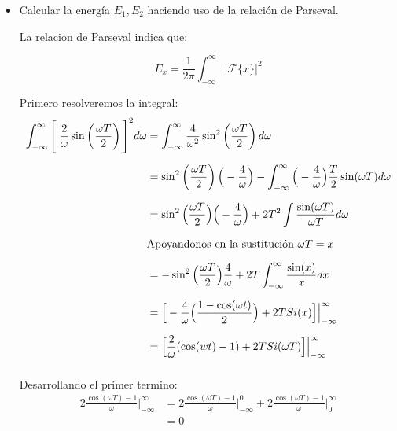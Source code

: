 \documentclass[12pt,a4paper]{report}
\begin{document}
\begin{enumerate}[label=\alph*),left=0pt]
\begin {itemize}[left=0pt]
\begin{figure}[h!]
\begin{minipage}{0.45\textwidth}
            \caption{Densidad espectral para $x_2$}
            \label{fig:imagen2}
          \end{minipage}
        \end{figure}

        \textbf{Reflexionar:} ¿La densidad espectral es discreta o continua? ¿El gráfico admite una simetría par, impar
        o ninguna?\\

        La densidad espectral tambien es una señal de tiempo continuo, y acepta simetria par.\\

      \item Calcular la energía $E_1, E_2$ haciendo uso de la relación de Parseval.

        La relacion de Parseval indica que:

        $$E_x=\frac{1}{2\pi}\int_{-\infty}^{\infty}|\mathcal{F}\{x\}|^2$$

        Primero resolveremos la integral:
        $$
        \begin{aligned}
          \int_{-\infty}^{\infty} \Bigg[\hspace{1mm}\frac{2}{\omega} \sin\left(\frac{\omega T}{2}\right)\Bigg]^2 d\omega
          &=\int_{-\infty}^{\infty} \frac{4}{\omega^2} \sin^2\left(\frac{\omega T}{2}\right) d\omega \\[6pt]
          &= \sin^2\left(\frac{\omega T}{2}\right) \Big(-\frac{4}{\omega}\Big) - \int_{-\infty}^{\infty} 
          \Big(-\frac{4}{\omega}\Big) \frac{T}{2} \sin(\omega T)d\omega \\[6pt]
          &= \sin^2\Big(\frac{\omega T}{2}\Big)\Big(-\frac{4}{\omega}\Big) +
            2 T^2 \int \frac{\sin(\omega T)}{\omega T}d\omega \\[6pt]
          &\text{Apoyandonos en la sustitución $\omega T=x$}\\[6pt]
          &=-\sin^2\Big(\frac{\omega T}{2}\Big)\frac{4}{\omega} + 2T \int_{-\infty}^{\infty} \frac{\sin(x)}{x} dx\\[6pt]
          &=\Big[-\frac{4}{\omega} \Big(\frac{1- \cos(\omega t)}{2}\Big) + 2T Si(x)\Big]\Big|_{-\infty}^{\infty}\\[6pt]
          &=\Big[\frac{2}{\omega} (\cos(wt) - 1) + 2T Si(\omega T)\Big]\Big|_{-\infty}^{\infty}\\[6pt]
        \end{aligned}
        $$

        Desarrollando el primer termino:
        $$
        \begin{aligned}
          2\frac{\cos(\omega T)-1}{\omega} \Big|_{-\infty}^{\infty}&=2\frac{\cos(\omega T)-1}{\omega} 
          \Big|_{-\infty}^{0} + 2\frac{\cos(\omega T)-1}{\omega} \Big|_{0}^{\infty}\\[6pt]
          &= 0
        \end{aligned}
        $$


\end{itemize}
\end{enumerate}
\end{document}
